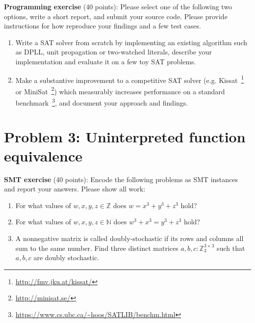 \documentclass[11pt]{article}
\begin{document}
    \noindent \textbf{Programming exercise} (40 points): Please select one of the following two options, write a short report, and submit your source code. Please provide instructions for how reproduce your findings and a few test cases.

    \begin{enumerate}
    \item Write a SAT solver from scratch by implementing an existing algorithm such as DPLL, unit propagation or two-watched literals, describe your implementation and evaluate it on a few toy SAT problems.
    \item Make a substantive improvement to a competitive SAT solver (e.g. Kissat~\footnote{\url{http://fmv.jku.at/kissat/}} or MiniSat~\footnote{\url{http://minisat.se/}}) which measurably increases performance on a standard benchmark~\footnote{\url{https://www.cs.ubc.ca/~hoos/SATLIB/benchm.html}}, and document your approach and findings.
    \end{enumerate}

    \section {Problem 3: Uninterpreted function equivalence}

    \noindent \textbf{SMT exercise} (40 points): Encode the following problems as SMT instances and report your answers. Please show all work:\\

    \begin{enumerate}
    \item For what values of $w, x, y, z \in \mathbb{Z}$ does $w = x^3+y^3+z^3$ hold?
    \item For what values of $w, x, y, z \in \mathbb{N}$ does $w^3 + x^3 = y^3+z^3$ hold?
    \item A nonnegative matrix is called doubly-stochastic if its rows and columns all sum to the same number. Find three distinct matrices $a, b, c: \mathbb{Z}_3^{3\times 3}$ such that $a, b, c$ are doubly stochastic.
    \end{enumerate}
\end{document}
